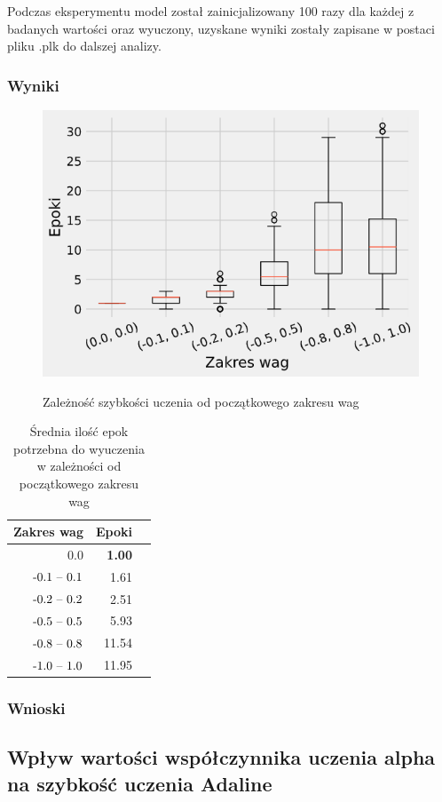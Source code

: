 \documentclass{article}
\begin{document}
Podczas eksperymentu model został zainicjalizowany 100 razy dla każdej z badanych wartości oraz wyuczony, uzyskane wyniki zostały zapisane w postaci pliku .plk do dalszej analizy.
\subsubsection*{Wyniki}

\begin{figure}[!h]
	\centering
	\caption{Zależność szybkości uczenia od początkowego zakresu wag}
	\includegraphics[width=.5\textwidth]{ada_w.png}
	\label{fig:res5}
\end{figure}

\begin{table}[!h]
	\caption{Średnia ilość epok potrzebna do wyuczenia w zależności od początkowego zakresu wag}
	\label{tabela-res-5}
	\centering
	\begin{tabular}{rrr}
		\toprule
		Zakres wag        & Epoki         \\
		\midrule
		0.0               & \textbf{1.00} \\
		\($-0.1 -- 0.1$\) & 1.61          \\
		\($-0.2 -- 0.2$\) & 2.51          \\
		\($-0.5 -- 0.5$\) & 5.93          \\
		\($-0.8 -- 0.8$\) & 11.54         \\
		\($-1.0 -- 1.0$\) & 11.95         \\
		\bottomrule
	\end{tabular}
\end{table}

\subsubsection*{Wnioski}

\newpage
\subsection{Wpływ wartości współczynnika uczenia alpha na szybkość uczenia Adaline}
\end{document}
